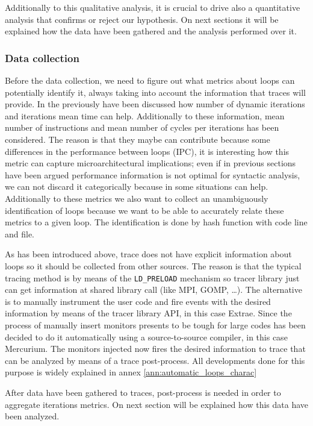 Additionally to this qualitative analysis, it is crucial to drive also  a quantitative
analysis that confirms or reject our hypothesis. On next sections it will be explained how the data have been gathered and the analysis performed over it.  

\subsubsection{Data collection}

Before the data collection, we need to figure out what metrics about loops can 
potentially identify it, always taking into account the information that traces 
will provide. In the previously have been discussed how number of dynamic 
iterations and iterations mean time can help. Additionally to these information, 
mean number of instructions and mean number of cycles per iterations has been 
considered. The reason is that they maybe can contribute because some 
differences in the performance between loops (IPC), it is interesting how this 
metric can capture microarchitectural implications; even if in previous sections 
have been argued
performance information is not optimal for syntactic analysis, we can not
discard it categorically because in some situations can help. Additionally to
these metrics we also want to collect an unambiguously identification of loops
because we want to be able to accurately relate these metrics to a given loop.
The identification is done by hash function with code line and file.

As has been introduced above, trace does not have explicit information about 
loops so it should be collected from other sources. The reason is that the typical
tracing method is by means of the {\tt LD\_PRELOAD} mechanism so tracer library just
can get information at shared library call (like MPI, GOMP, \dots). The alternative
is to manually instrument the user code and fire events with the desired information
by means of the tracer library API, in this case Extrae. Since the process of
manually insert monitors presents to be tough for large codes has been decided
to do it automatically using a source-to-source compiler, in this case
Mercurium. The monitors injected now fires the desired information to trace that
can be analyzed by means of a trace post-process. All developments done for this
purpose is widely explained in annex \ref{ann:automatic_loops_charac}

After data have been gathered to traces, post-process is needed in order to
aggregate iterations metrics. On next section will be explained how this data
have been analyzed. 

